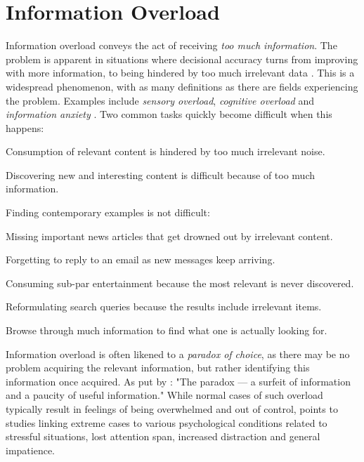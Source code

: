 \section{Information Overload}

Information overload conveys the act of receiving \emph{too much information}. 
The problem is apparent in situations where decisional accuracy turns from improving with more information, 
to being hindered by too much irrelevant data \cite[p13]{Bjorkoy2010d}. 
This is a widespread phenomenon, with as many definitions as there are fields experiencing the problem. 
Examples include \emph{sensory overload}, \emph{cognitive overload} and \emph{information anxiety} \cite[p2]{Eppler2004}.
Two common tasks quickly become difficult when this happens:

\begin{enumerate*}
  \item Consumption of relevant content is hindered by too much irrelevant noise.
  \item Discovering new and interesting content is difficult because of too much information.
\end{enumerate*}

\noindent
Finding contemporary examples is not difficult:

\begin{itemize*}
  \item Missing important news articles that get drowned out by irrelevant content.
  \item Forgetting to reply to an email as new messages keep arriving.
  \item Consuming sub-par entertainment because the most relevant is never discovered.
  \item Reformulating search queries because the results include irrelevant items.
  \item Browse through much information to find what one is actually looking for.
\end{itemize*}

Information overload is often likened to a \emph{paradox of choice}, as there may be no problem acquiring the relevant information, 
but rather identifying this information once acquired. As put by \cite[p6]{Edmunds2000}: 
"The paradox --- a surfeit of information and a paucity of useful information."
While normal cases of such overload typically result in feelings of being overwhelmed and out of control, 
\citet[p5]{Bawden2008} points to studies linking extreme cases to various psychological conditions 
related to stressful situations, lost attention span, increased distraction and general impatience.

